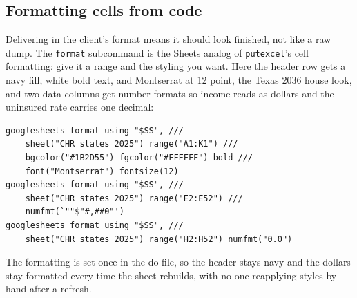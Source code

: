 \documentclass[
    a4paper,
    fontsize=10pt,
    twoside=true,
    numbers=noenddot,
]{kaobook}
\begin{document}
\subsection{Formatting cells from code}
Delivering in the client's format means it should look finished, not like a raw dump. The \texttt{format} subcommand is the Sheets analog of \texttt{putexcel}'s cell formatting: give it a range and the styling you want. Here the header row gets a navy fill, white bold text, and Montserrat at 12 point, the Texas 2036 house look, and two data columns get number formats so income reads as dollars and the uninsured rate carries one decimal:
{\footnotesize
\begin{verbatim}
googlesheets format using "$SS", ///
    sheet("CHR states 2025") range("A1:K1") ///
    bgcolor("#1B2D55") fgcolor("#FFFFFF") bold ///
    font("Montserrat") fontsize(12)
googlesheets format using "$SS", ///
    sheet("CHR states 2025") range("E2:E52") ///
    numfmt(`""$"#,##0"')
googlesheets format using "$SS", ///
    sheet("CHR states 2025") range("H2:H52") numfmt("0.0")
\end{verbatim}
}
The formatting is set once in the do-file, so the header stays navy and the dollars stay formatted every time the sheet rebuilds, with no one reapplying styles by hand after a refresh.
\end{document}
